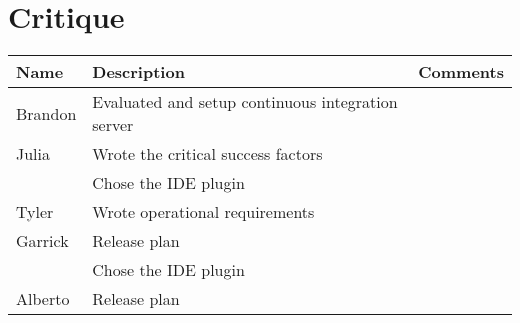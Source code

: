 \section{Critique}
\begin{tabular}{| l | l | l |}
\hline
Name & Description & Comments \\
\hline
Brandon & Evaluated and setup continuous integration server \\
\hline
Julia & Wrote the critical success factors \\
 & Chose the IDE plugin \\
\hline
Tyler & Wrote operational requirements \\
\hline
Garrick & Release plan \\
 & Chose the IDE plugin \\
\hline
Alberto & Release plan  \\
\hline
\end{tabular}
